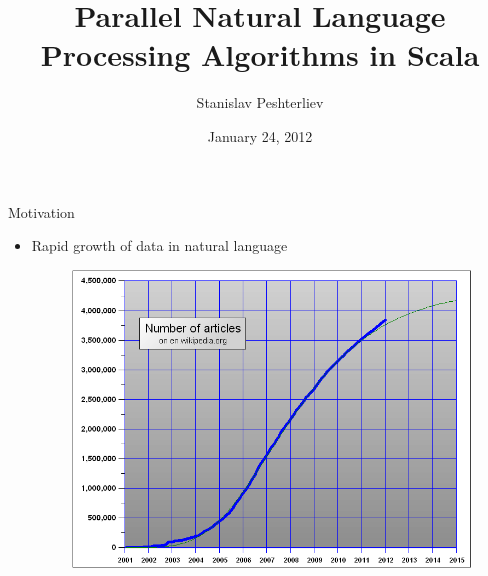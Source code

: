 \documentclass{beamer}
\title[Parallel Natural Language Processing Algorithms in Scala]{Parallel Natural Language Processing Algorithms in Scala}
\author{Stanislav Peshterliev}
\institute{EPFL}
\date{January 24, 2012}
\begin{document}
\begin{frame}
\titlepage
\end{frame}

\begin{frame}{Motivation}

\begin{itemize}
 \item Rapid growth of data in natural language

\begin{figure}[!htb]
  \centering
  \includegraphics[scale=0.30]{presentation/EnwikipediaGom.PNG}
\end{figure}

\end{itemize}

\end{frame}

\end{document}
